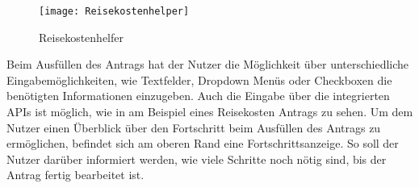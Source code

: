 \begin{figure}[h]
  \centering
    \texttt{[image: Reisekostenhelper]}
    \caption{Reisekostenhelfer}\label{Reisekostenhelfer}
\end{figure}


Beim Ausfüllen des Antrags hat der Nutzer die Möglichkeit über unterschiedliche Eingabemöglichkeiten,
wie Textfelder, Dropdown Menüs oder Checkboxen die benötigten Informationen einzugeben. Auch die Eingabe
über die integrierten APIs ist möglich, wie in  am Beispiel eines Reisekosten Antrags zu sehen.
Um dem Nutzer einen Überblick über den Fortschritt beim Ausfüllen des Antrags zu ermöglichen, befindet sich am oberen 
Rand eine Fortschrittsanzeige.
So soll der Nutzer darüber informiert werden, wie viele Schritte noch
nötig sind, bis der Antrag fertig bearbeitet ist. 







